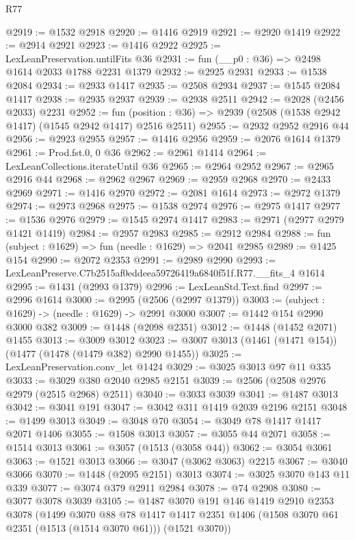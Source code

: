 \begin{lexlean}{R77}
\begin{coremodule}
{{@2919 := @1532 @2918
@2920 := @1416 @2919
@2921 := @2920 @1419
@2922 := @2914 @2921
@2923 := @1416 @2922
@2925 := LexLeanPreservation.untilFits @36
@2931 := fun (__p0 : @36) => @2498 @1614 @2033 @1788 @2231 @1379
@2932 := @2925 @2931
@2933 := @1538 @2084
@2934 := @2933 @1417
@2935 := @2508 @2934
@2937 := @1545 @2084 @1417
@2938 := @2935 @2937
@2939 := @2938 @2511
@2942 := @2028 (@2456 @2033) @2231
@2952 := fun (position : @36) => @2939 (@2508 (@1538 @2942 @1417) (@1545 @2942 @1417) @2516 @2511)
@2955 := @2932 @2952 @2916 @44
@2956 := @2923 @2955
@2957 := @1416 @2956
@2959 := @2076 @1614 @1379
@2961 := Prod.fst.{0, 0} @36
@2962 := @2961 @1414
@2964 := LexLeanCollections.iterateUntil @36
@2965 := @2964 @2952
@2967 := @2965 @2916 @44
@2968 := @2962 @2967
@2969 := @2959 @2968
@2970 := @2433 @2969
@2971 := @1416 @2970
@2972 := @2081 @1614
@2973 := @2972 @1379
@2974 := @2973 @2968
@2975 := @1538 @2974
@2976 := @2975 @1417
@2977 := @1536 @2976
@2979 := @1545 @2974 @1417
@2983 := @2971 (@2977 @2979 @1421 @1419)
@2984 := @2957 @2983
@2985 := @2912 @2984
@2988 := fun (subject : @1629) => fun (needle : @1629) => @2041 @2985
@2989 := @1425 @154
@2990 := @2072 @2353
@2991 := @2989 @2990
@2993 := LexLeanPreserve.C7b2515af0eddeea59726419a6840f51f.R77.__fits_4 @1614
@2995 := @1431 (@2993 @1379)
@2996 := LexLeanStd.Text.find
@2997 := @2996 @1614
@3000 := @2995 (@2506 (@2997 @1379))
@3003 := (subject : @1629) -> (needle : @1629) -> @2991 @3000
@3007 := @1442 @154 @2990 @3000 @382
@3009 := @1448 (@2098 @2351)
@3012 := @1448 (@1452 @2071) @1455
@3013 := @3009 @3012
@3023 := @3007 @3013 (@1461 (@1471 @154)) (@1477 (@1478 (@1479 @382) @2990 @1455))
@3025 := LexLeanPreservation.conv_let @1424
@3029 := @3025 @3013 @97 @11 @335
@3033 := @3029 @380 @2040 @2985 @2151
@3039 := @2506 (@2508 @2976 @2979 (@2515 @2968) @2511)
@3040 := @3033 @3039
@3041 := @1487 @3013
@3042 := @3041 @191
@3047 := @3042 @311 @1419 @2039 @2196 @2151
@3048 := @1499 @3013
@3049 := @3048 @70
@3054 := @3049 @78 @1417 @1417 @2071 @1406
@3055 := @1508 @3013
@3057 := @3055 @44 @2071
@3058 := @1514 @3013
@3061 := @3057 (@1513 (@3058 @44))
@3062 := @3054 @3061
@3063 := @1521 @3013
@3066 := @3047 (@3062 @3063) @2215
@3067 := @3040 @3066
@3070 := @1448 (@2095 @2151) @3013
@3074 := @3025 @3070 @143 @11 @339
@3077 := @3074 @379 @2911 @2984
@3078 := @74 @2908
@3080 := @3077 @3078 @3039
@3105 := @1487
    @3070
    @191
    @146
    @1419
    @2910
    @2353
    @3078
    (@1499
      @3070
      @88
      @78
      @1417
      @1417
      @2351
      @1406
      (@1508 @3070 @61 @2351 (@1513 (@1514 @3070 @61)))
      (@1521 @3070))
}}
\end{coremodule}
\end{lexlean}
